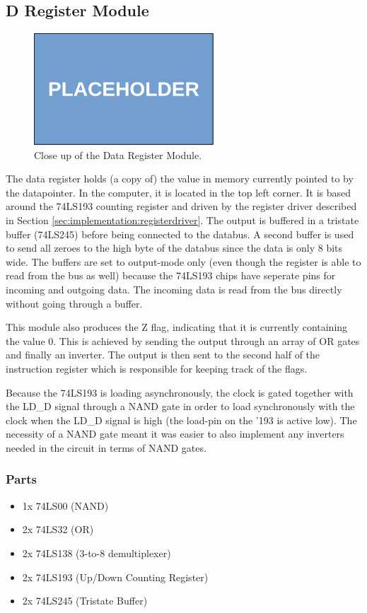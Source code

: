 \subsection{D Register Module}
\begin{figure}[H]
  \centering
  \includegraphics[width=0.6\textwidth]{img/placeholder}
  \caption{Close up of the Data Register Module.}
  \label{fig:dregcloseup}
\end{figure}

The data register holds (a copy of) the value in memory currently pointed to by the datapointer. In the computer, it is located in the top left corner. It is based around the 74LS193 counting register and driven by the register driver described in Section \ref{sec:implementation:registerdriver}. The output is buffered in a tristate buffer (74LS245) before being connected to the databus. A second buffer is used to send all zeroes to the high byte of the databus since the data is only 8 bits wide. The buffers are set to output-mode only (even though the register is able to read from the bus as well) because the 74LS193 chips have seperate pins for incoming and outgoing data. The incoming data is read from the bus directly without going through a buffer.

This module also produces the Z flag, indicating that it is currently containing the value 0. This is achieved by sending the output through an array of OR gates and finally an inverter. The output is then sent to the second half of the instruction register which is responsible for keeping track of the flags.

Because the 74LS193 is loading asynchronously, the clock is gated together with the LD\_D signal through a NAND gate in order to load synchronously with the clock when the LD\_D signal is high (the load-pin on the '193 is active low). The necessity of a NAND gate meant it was easier to also implement any inverters needed in the circuit in terms of NAND gates.

\subsubsection*{Parts}
\begin{itemize}\itemsep0em
\item 1x 74LS00 (NAND)
\item 2x 74LS32 (OR)
\item 2x 74LS138 (3-to-8 demultiplexer)
\item 2x 74LS193 (Up/Down Counting Register)
\item 2x 74LS245 (Tristate Buffer)
\end{itemize}

